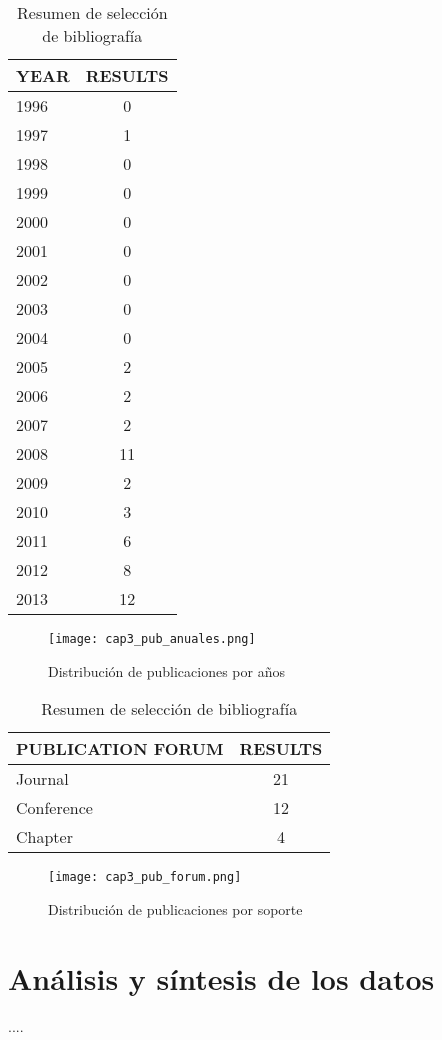 \begin{table}[H]
  \begin{center}
  \begin{tabular}{| m{4cm} | c |}
    \hline
    YEAR & RESULTS\\
    \hline
    \hline 
    1996 & 0\\
    \hline
    1997 & 1\\
    \hline
    1998 & 0\\
    \hline
    1999 & 0\\
    \hline
    2000 & 0\\
    \hline
    2001 & 0\\
    \hline
    2002 & 0\\
    \hline
    2003 & 0\\
    \hline
    2004 & 0\\
    \hline
    2005 & 2\\
    \hline
    2006 & 2\\
    \hline
    2007 & 2\\
    \hline
    2008 & 11\\
    \hline
    2009 & 2\\
    \hline
    2010 & 3\\
    \hline
    2011 & 6\\
    \hline
    2012 & 8\\
    \hline
    2013 & 12 \\
    \hline
  \end{tabular}
\end{center}
\caption{Resumen de selección de bibliografía}
\label{tab:ResumenAniosResultados}
\end{table} 

\begin{figure}[H]
  \begin{center}
    \texttt{[image: cap3\_pub\_anuales.png]}
  \end{center}
  \caption{Distribución de publicaciones por años}
  \label{fig:PublicacionesAnuales}
\end{figure}

\begin{table}[H]
  \begin{center}
  \begin{tabular}{| m{4cm} | c |}
    \hline
    PUBLICATION FORUM & RESULTS\\
    \hline
    \hline 
    Journal & 21 \\
    \hline
    Conference & 12 \\
    \hline
    Chapter & 4 \\
    \hline
  \end{tabular}
\end{center}
\caption{Resumen de selección de bibliografía}
\label{tab:ResumenForumResultados}
\end{table} 

\begin{figure}[H]
  \begin{center}
    \texttt{[image: cap3\_pub\_forum.png]}
  \end{center}
  \caption{Distribución de publicaciones por soporte}
  \label{fig:PublicacionesForum}
\end{figure}



\section{Análisis y síntesis de los datos}

....
